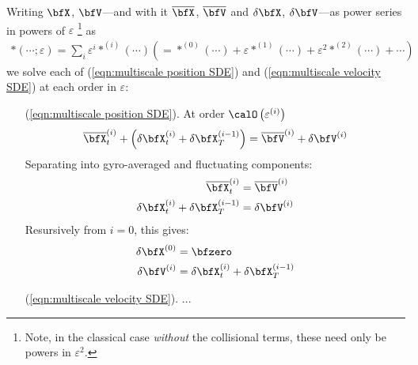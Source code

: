     Writing $\bfX$, $\bfV$---and with it $\overline{\bfX}$, $\overline{\bfV}$ and $\delta\bfX$, $\delta\bfV$---as power series in powers of $\varepsilon$ \footnote{Note, in the classical case \emph{without} the collisional terms, these need only be powers in $\varepsilon^{2}$.} as
    \begin{align}
        *(\cdots; \varepsilon)  =  \sum_{i}\varepsilon^{i}*^{(i)}(\cdots)  \left(=  *^{(0)}(\cdots) + \varepsilon*^{(1)}(\cdots) + \varepsilon^{2}*^{(2)}(\cdots) + \cdots\right)
    \end{align}
    we solve each of (\ref{eqn:multiscale position SDE}) and (\ref{eqn:multiscale velocity SDE}) at each order in $\varepsilon$: 
    \begin{itemize}
        \item[(\ref{eqn:multiscale position SDE}).]  At order $\calO\left(\varepsilon^{(i)}\right)$
        \begin{equation}
            \overline{\bfX}^{(i)}_{t} + \left(\delta\bfX^{(i)}_{t} + \delta\bfX^{(i - 1)}_{T}\right)  =  \overline{\bfV}^{(i)} + \delta\bfV^{(i)}
        \end{equation}
        Separating into gyro-averaged and fluctuating components:
        \begin{align}
            \overline{\bfX}^{(i)}_{t}  &=  \overline{\bfV}^{(i)}  \\
            \delta\bfX^{(i)}_{t} + \delta\bfX^{(i - 1)}_{T}  &=  \delta\bfV^{(i)}
        \end{align}
        Resursively from $i = 0$, this gives:
        \begin{align}
            \delta\bfX^{(0)}  &=  \bfzero  \\
            \delta\bfV^{(i)}  &=  \delta\bfX^{(i)}_{t} + \delta\bfX^{(i - 1)}_{T}
        \end{align}
        
        \item[(\ref{eqn:multiscale velocity SDE}).]  ...
    \end{itemize}
    
    